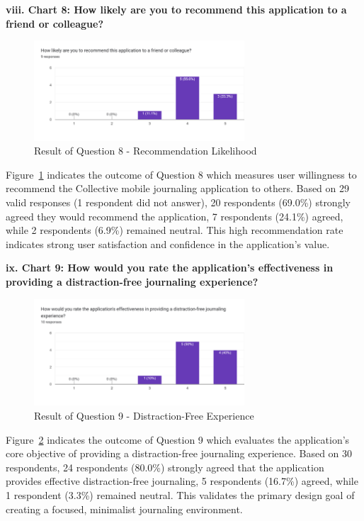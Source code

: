 \textbf{viii. Chart 8: How likely are you to recommend this application to a friend or colleague?}

\begin{figure}[H]
\centering
\includegraphics[width=0.7\textwidth]{files/imgs/survey/chart8_recommendation.png}
\caption{Result of Question 8 - Recommendation Likelihood}
\label{fig:chart8-recommend}
\end{figure}

Figure~\ref{fig:chart8-recommend} indicates the outcome of Question 8 which measures user willingness to recommend the Collective mobile journaling application to others. Based on 29 valid responses (1 respondent did not answer), 20 respondents (69.0\%) strongly agreed they would recommend the application, 7 respondents (24.1\%) agreed, while 2 respondents (6.9\%) remained neutral. This high recommendation rate indicates strong user satisfaction and confidence in the application's value.

\textbf{ix. Chart 9: How would you rate the application's effectiveness in providing a distraction-free journaling experience?}

\begin{figure}[H]
\centering
\includegraphics[width=0.7\textwidth]{files/imgs/survey/chart9_distraction_free.png}
\caption{Result of Question 9 - Distraction-Free Experience}
\label{fig:chart9-distraction}
\end{figure}

Figure~\ref{fig:chart9-distraction} indicates the outcome of Question 9 which evaluates the application's core objective of providing a distraction-free journaling experience. Based on 30 respondents, 24 respondents (80.0\%) strongly agreed that the application provides effective distraction-free journaling, 5 respondents (16.7\%) agreed, while 1 respondent (3.3\%) remained neutral. This validates the primary design goal of creating a focused, minimalist journaling environment.

